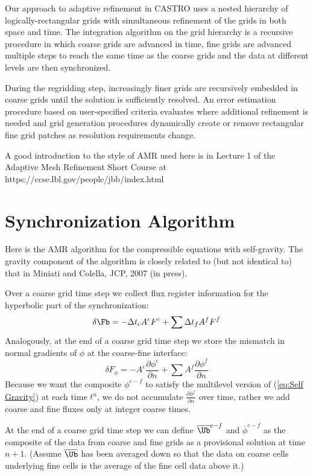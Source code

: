 Our approach to adaptive refinement in CASTRO uses a nested
hierarchy of logically-rectangular grids with simultaneous refinement
of the grids in both space and time.  The integration algorithm on the grid hierarchy
is a recursive procedure in which coarse grids are advanced in time,
fine grids are advanced multiple steps to reach the same time
as the coarse grids and the data at different levels are then synchronized.

During the regridding step, increasingly finer grids
are recursively embedded in coarse grids until the solution is
sufficiently resolved.  An error estimation procedure based on
user-specified criteria evaluates where additional refinement is needed
and grid generation procedures dynamically create or
remove rectangular fine grid patches as resolution requirements change.

A good introduction to the style of AMR used here is in Lecture 1
of the Adaptive Mesh Refinement Short Course at
https://ccse.lbl.gov/people/jbb/index.html

\section{Synchronization Algorithm}

Here is the AMR algorithm for the compressible equations with
self-gravity.  The gravity component of the algorithm 
is closely related to (but not identical to) that in Miniati and Colella,
JCP, 2007 (in press).

Over a coarse grid time step 
we collect flux register information for the hyperbolic part of the synchronization:
\begin{equation}
\delta\Fb = -\Delta t_c A^c F^c + \sum \Delta t_f A^f F^f
\end{equation}
Analogously, at the end of a coarse grid time step 
we store the mismatch in normal gradients of $\phi$ at the coarse-fine interface:
\begin{equation}
\delta F_\phi =  - A^c \frac{\partial \phi^c}{\partial n}
+ \sum A^f \frac{\partial \phi^f}{\partial n}
\end{equation}
Because we want the composite $\phi^{c-f}$ to satisfy the multilevel version of  (\ref{eq:Self Gravity}) at each time $t^n$, we do not accumulate $\frac{\partial \phi^f}{\partial n}$ over time, rather we add coarse and fine fluxes only at integer coarse times.

At the end of a coarse grid time step we can define
${\overline{\Ub}}^{c-f}$ and $\overline{\phi}^{c-f}$
as the composite of the data from coarse and fine grids as a provisional solution at
time $n+1$. (Assume $\overline{\Ub}$ has been averaged down so that the data on coarse cells
underlying fine cells is the average of the fine cell data above it.)


